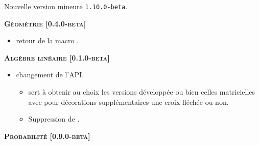 Nouvelle version mineure \verb+1.10.0-beta+.




\begin{center}
    \textbf{\textsc{Géométrie [0.4.0-beta]}}
\end{center}

\begin{itemize}[itemsep=.5em]
    \item {}
          retour de la macro .


\end{itemize}


\separation




\begin{center}
    \textbf{\textsc{Algèbre linéaire [0.1.0-beta]}}
\end{center}

\begin{itemize}[itemsep=.5em]
    \item {} changement de l'API.
    \begin{itemize}[itemsep=.5em]
        \item {} sert à obtenir au choix les versions développée ou bien celles matricielles avec pour décorations supplémentaires une croix fléchée ou non.

        \item Suppression de .
    \end{itemize}


\end{itemize}


\separation




\begin{center}
    \textbf{\textsc{Probabilité [0.9.0-beta]}}
\end{center}

